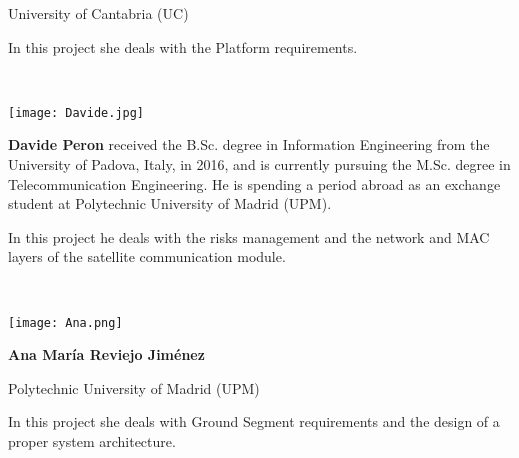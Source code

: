 \documentclass[11pt,a4paper,titlepage]{article}
\begin{document}
{\begin{center}
\begin{minipage}{0.7\textwidth}
University of Cantabria (UC)

In this project she deals with the Platform requirements.
\end{minipage}\\ \vspace{0.5cm}
\begin{minipage}{0.2\textwidth}
	\texttt{[image: Davide.jpg]}
\end{minipage}\hspace{0.5cm}
\begin{minipage}{0.7\textwidth}
\textbf{Davide Peron} received the B.Sc. degree in Information Engineering from the University of Padova, Italy, in 2016, and is currently pursuing the M.Sc. degree in Telecommunication Engineering. He is spending a period abroad as an exchange student at Polytechnic University of Madrid (UPM).

In this project he deals with the risks management and the network and MAC layers of the satellite communication module.
\end{minipage}\\ \vspace{0.5cm}
\begin{minipage}{0.2\textwidth}
		\texttt{[image: Ana.png]}
\end{minipage}\hspace{0.5cm}
\begin{minipage}{0.7\textwidth}
	\textbf{Ana María Reviejo Jiménez}

	Polytechnic University of Madrid (UPM)

In this project she deals with Ground Segment requirements and the design of a proper system architecture.
\end{minipage}\\
\end{center}

}
\end{document}
